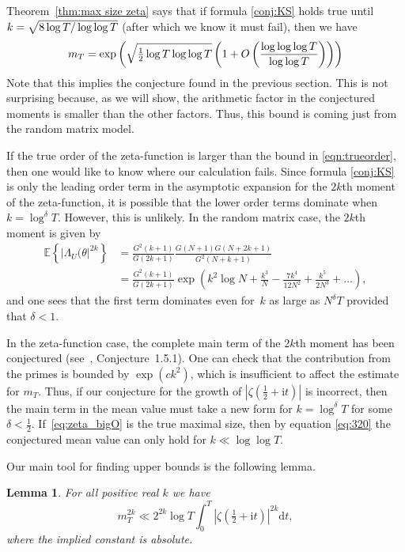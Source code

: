 \documentclass[10pt,reqno,twoside]{amsart}
\renewcommand{\d}{{\mathrm{d}}} %
\renewcommand{\i}{{\mathrm{i}}} %
\newcommand{\E}{\mathbb{E}}
\newtheorem{lemma}[theorem]{Lemma}
\numberwithin{equation}{section}
\numberwithin{theorem}{section}
\begin{document}
{{Theorem~\ref{thm:max size zeta} says that if formula
\eqref{conj:KS} holds true until $k = \sqrt{\mathstrut 8\log T / \log\log T}$
(after which we know it must fail), then we have
\begin{equation}
\label{eqn:trueorder}
m_T = \exp\left( \sqrt{\mathstrut \tfrac12 \log T \log\log T}
\left(1+O\left(\frac{\log\log\log T}{\log\log T}\right) \right) \right)
\end{equation}
Note that this implies the conjecture found in the previous section.
This is not surprising because, as we will show, the arithmetic factor
in the conjectured moments is smaller than the other factors.  Thus,
this bound is coming just from the random matrix model.

If the true order of the zeta-function is larger than the
bound in \eqref{eqn:trueorder}, then one would like to know
where our calculation fails.  Since
formula \eqref{conj:KS} is only the leading order term in the
asymptotic expansion for the $2k$th moment of the zeta-function,
it is possible that the lower order terms dominate when $k=\log^\delta T$.
However, this is unlikely.  In the random matrix case, the $2k$th
moment is given by
\begin{align}
\E\left\{\left|\Lambda_U(\theta\right|^{2k} \right\} &=
\frac{G^2(k+1)}{G(2k+1)} \frac{G(N+1) G(N+2k+1)}{G^2(N+k+1)}\\
&=\frac{G^2(k+1)}{G(2k+1)} \exp\left(k^2\log N + \frac{k^3}{N} -
\frac{7k^4}{12 N^2} + \frac{k^5}{2N^3} + \dots \right),
\end{align}
and one sees that the first term dominates even
for~$k$ as large as $N^\delta T$ provided that $\delta<1$.

In the zeta-function case, the complete main term of the $2k$th
moment has been conjectured (see~\cite{CFKRS}, Conjecture~1.5.1). One
can check that the contribution from the primes is bounded by
$\exp(c k^2)$, which is insufficient to affect the estimate for
$m_T$.  Thus, if our conjecture for the growth of $|\zeta(\frac12 +
\i t)|$ is incorrect, then the main term in the mean value must
take a new form for $k=\log^\delta T$ for some $\delta<\frac12$.
If~\eqref{eq:zeta_bigO} is the true maximal size, then by equation
\eqref{eq:320} the conjectured mean value can only hold for $k \ll
\log\log T$.


Our main tool for finding upper bounds is the following lemma.

\begin{lemma}\label{lem:lower bound}
For all positive real $k$ we have
\begin{equation}
m_T^{2k} \ll 2^{2k} \log T \int_0^T |\zeta(\tfrac12+\i t)|^{2k} \d t ,
\end{equation}
where the implied constant is absolute.
\end{lemma}

}}
\end{document}
